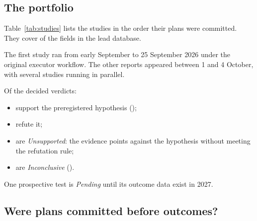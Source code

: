 \subsection{The portfolio}

Table~\ref{tab:studies} lists the \StudiesTotal{} studies in the order their plans were committed. They cover
\StudyDomains{} of the \LeadDomains{} fields in the lead database.

The first study ran from early September to 25 September 2026 under the original executor workflow. The other
\ReportsAfterFirst{} reports appeared between 1 and 4 October, with several studies running in parallel.

Of the \VerdictsDecided{} decided verdicts:
\begin{itemize}
\item \VerdictSupported{} support the preregistered hypothesis (\CISupported{});
\item \VerdictRefuted{} refute it;
\item \VerdictUnsupported{} are \emph{Unsupported}: the evidence points against the hypothesis without meeting the
refutation rule;
\item \VerdictInconclusive{} are \emph{Inconclusive} (\CIInconclusive{}).
\end{itemize}
One prospective test is \emph{Pending} until its outcome data exist in 2027.

\begin{table}[t]
\centering\footnotesize
\caption{The \StudiesTotal{} studies in order of plan commit. The ``Field'' column gives the subject area; the lead
database groups the five Auckland studies as one field. ``Plan first'': git shows the plan committed before any
outcome file; $^\dagger$plan committed together with pre-outcome material only (both coders agree;
Section~\ref{sec:prereg}). ``Blinding'': how outcomes were kept from the agent. Sealed means stored unread with a
hash committed; prospective means the outcome did not yet exist; partial means a pending hold-out (waitlist) or
published final scores already known (MCF). ``Power'': whether the plan stated a power calculation or minimum
detectable effect.}
\label{tab:studies}

\end{table}

\subsection{Were plans committed before outcomes?}
\label{sec:prereg}

